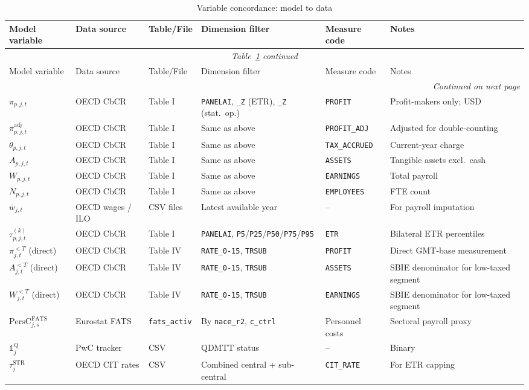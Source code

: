 \documentclass[11pt,a4paper]{article}
\newcommand{\code}[1]{\texttt{#1}}
\begin{document}
\begin{landscape}
\begin{longtable}{@{}p{2.5cm}p{3cm}p{2cm}p{2.5cm}p{3cm}p{3cm}@{}}
\caption{Variable concordance: model to data}\label{tab:concordance_table}\\
\toprule
Model variable & Data source & Table/File & Dimension filter & Measure code & Notes \\
\midrule
\endfirsthead
\multicolumn{6}{c}{\textit{Table~\ref{tab:concordance_table} continued}}\\
\toprule
Model variable & Data source & Table/File & Dimension filter & Measure code & Notes \\
\midrule
\endhead
\midrule
\multicolumn{6}{r}{\textit{Continued on next page}}\\
\endfoot
\bottomrule
\endlastfoot

$\pi_{p,j,t}$ & OECD CbCR & Table I & \code{PANELAI}, \code{\_Z} (ETR), \code{\_Z} (stat.\ op.) & \code{PROFIT} & Profit-makers only; USD \\
$\pi_{p,j,t}^{\text{adj}}$ & OECD CbCR & Table I & Same as above & \code{PROFIT\_ADJ} & Adjusted for double-counting \\
$\theta_{p,j,t}$ & OECD CbCR & Table I & Same as above & \code{TAX\_ACCRUED} & Current-year charge \\
$A_{p,j,t}$ & OECD CbCR & Table I & Same as above & \code{ASSETS} & Tangible assets excl.\ cash \\
$W_{p,j,t}$ & OECD CbCR & Table I & Same as above & \code{EARNINGS} & Total payroll \\
$N_{p,j,t}$ & OECD CbCR & Table I & Same as above & \code{EMPLOYEES} & FTE count \\
$\bar{w}_{j,t}$ & OECD wages / ILO & CSV files & Latest available year & -- & For payroll imputation \\
$\tau_{p,j,t}^{(k)}$ & OECD CbCR & Table I & \code{PANELAI}, \code{P5}/\code{P25}/\code{P50}/\code{P75}/\code{P95} & \code{ETR} & Bilateral ETR percentiles \\
$\pi_{j,t}^{<T}$ (direct) & OECD CbCR & Table IV & \code{RATE\_0-15}, \code{TRSUB} & \code{PROFIT} & Direct GMT-base measurement \\
$A_{j,t}^{<T}$ (direct) & OECD CbCR & Table IV & \code{RATE\_0-15}, \code{TRSUB} & \code{ASSETS} & SBIE denominator for low-taxed segment \\
$W_{j,t}^{<T}$ (direct) & OECD CbCR & Table IV & \code{RATE\_0-15}, \code{TRSUB} & \code{EARNINGS} & SBIE denominator for low-taxed segment \\
$\text{PersC}_{j,s}^{\text{FATS}}$ & Eurostat FATS & \code{fats\_activ} & By \code{nace\_r2}, \code{c\_ctrl} & Personnel costs & Sectoral payroll proxy \\
$\mathbb{1}_j^{\text{Q}}$ & PwC tracker & CSV & QDMTT status & -- & Binary \\
$\tau_{j}^{\text{STR}}$ & OECD CIT rates & CSV & Combined central + sub-central & \code{CIT\_RATE} & For ETR capping \\

\end{longtable}
\end{landscape}
\end{document}
